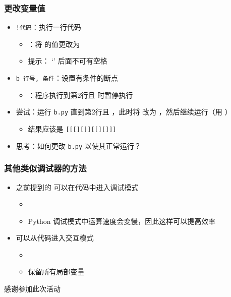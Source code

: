 \begin{CJK}{UTF8}{gbsn}
\begin{frame} [fragile]
	\frametitle{更改变量值}
	\linespread{1.25}
	\begin{itemize}
	\item \texttt{!代码}：执行一行代码
		\begin{itemize}
		\item {}：将  的值更改为 
		\item 提示： `\inlinePython{!}' 后面不可有空格
		\end{itemize}
	\item \texttt{b 行号, 条件}：设置有条件的断点
		\begin{itemize}
		\item {}：程序执行到第2行且  时暂停执行
		\end{itemize}
	\item 尝试：运行 \texttt{b.py} 直到第2行且  ，此时将
				 改为  ，然后继续运行（用 
				 ）
		\begin{itemize}
		\item 结果应该是 \texttt{[[[][]][[][]]]}
		\end{itemize}
	\item 思考：如何更改 \texttt{b.py} 以使其正常运行？
	\end{itemize}
	\begin{comment}
	b 2, x == -3
	r
	p x			# -3
	!x = 0
	c
	\end{comment}
\end{frame}

\begin{frame} [fragile]
	\frametitle{其他类似调试器的方法}
	\linespread{1.5}
	\begin{itemize}
	\item 之前提到的  可以在代码中进入调试模式
		\begin{itemize}
		\item {}
		\item Python 调试模式中运算速度会变慢，因此这样可以提高效率
		\end{itemize}
	\item {} 可以从代码进入交互模式
		\begin{itemize}
		\item {}
		\item {} 保留所有局部变量
		\end{itemize}
	\end{itemize}
\end{frame}

\PreLastFrame
\begin{frame}
	\centerline{\fontsize{32}{32}\selectfont 感谢参加此次活动}
\end{frame}

\newpage
\end{CJK}


